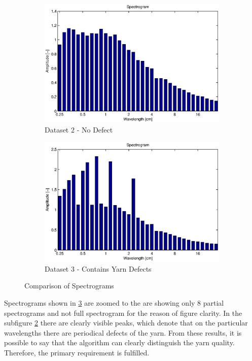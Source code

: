 \documentclass[twoside]{ctuthesis}
\theoremstyle{plain}
\theoremstyle{definition}
\theoremstyle{note}
\begin{document}
\begin{figure}
	\centering
	\begin{subfigure}{0.5\textwidth}
		\centering
		\includegraphics[width=1.0\linewidth]{prize1_short.eps}
		\caption{Dataset 2 - No Defect}
		\label{fig:specData2}
	\end{subfigure}%
	\begin{subfigure}{0.5\textwidth}
		\centering
		\includegraphics[width=1.0\linewidth]{moire1.eps}
		\caption{Dataset 3 - Contains Yarn Defects}
		\label{fig:specData3}
	\end{subfigure}
	\caption{Comparison of Spectrograms}
	\label{fig:specComparison}
\end{figure}

Spectrograms shown in \ref{fig:specComparison} are zoomed to the are showing only 8 partial spectrograms and not full spectrogram for the reason of figure clarity. In the subfigure \ref{fig:specData3} there are clearly visible peaks, which denote that on the particular wavelengths there are periodical defects of the yarn. From these results, it is possible to say that the algorithm can clearly distinguish the yarn quality. Therefore, the primary requirement is fulfilled.
\end{document}
